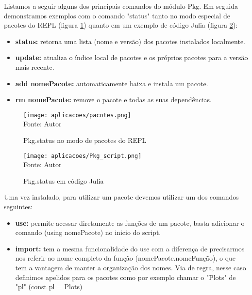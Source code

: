 Listamos a seguir alguns dos principais comandos do módulo Pkg. Em seguida demonstramos exemplos com o comando "status"  tanto no modo especial de pacotes do REPL (figura \ref{pacotes}) quanto em um exemplo de código Julia (figura \ref{Pkg_script}):
\begin{itemize}
  \item \textbf{status:} retorna uma lista (nome e versão) dos pacotes instalados localmente.
  \item \textbf{update:} atualiza o índice local de pacotes e os próprios pacotes para a versão mais recente.
  \item \textbf{add nomePacote:} automaticamente baixa e instala um pacote.
  \item \textbf{rm nomePacote:} remove o pacote e todas as suas dependências.
\end{itemize}

\begin{figure}[H]
\begin{center}
    \caption{Pkg.status no modo de pacotes do REPL} 
    \label{pacotes}
    \texttt{[image: aplicacoes/pacotes.png]} \\
    {\tiny \sf Fonte: Autor}
\end{center}
\end{figure} 
\begin{figure}[H]
\begin{center}
    \caption{Pkg.status em código Julia} 
    \label{Pkg_script}
    \texttt{[image: aplicacoes/Pkg\_script.png]} \\
    {\tiny \sf Fonte: Autor}
\end{center}
\end{figure} 

Uma vez instalado, para utilizar um pacote devemos utilizar um dos comandos seguintes:
\begin{itemize}
  \item \textbf{use:} permite acessar diretamente as funções de um pacote, basta adicionar o comando (using nomePacote) no inicio do script. 
  \item \textbf{import:} tem a mesma funcionalidade do use com a diferença de precisarmos nos referir ao nome completo da função (nomePacote.nomeFunção), o que tem a vantagem de manter a organização dos nomes. Via de regra, nesse caso definimos apelidos para os pacotes como por exemplo chamar o "Plots" de "pl" (const pl = Plots) %
\end{itemize}

